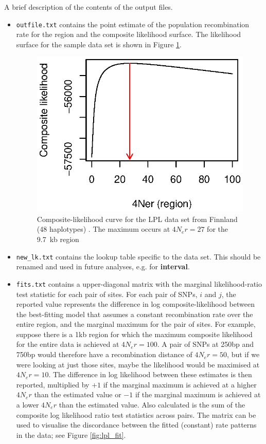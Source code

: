 \documentclass[a4paper,10pt,fullpage]{article}
\begin{document}
\noindent A brief description of the contents of the output files.
\begin{itemize}
\item {\verb+outfile.txt+} contains the point estimate of the
population recombination rate for the region and the composite
likelihood surface.  The likelihood surface for the sample data
set is shown in Figure \ref{fig:lpl_surf}.


\begin{figure}[t]
\linespread{1.3} \centering
\includegraphics[scale=1.0]{LPLCLcurve.eps}
\caption{Composite-likelihood curve for the LPL data set from
Finnland (48 haplotypes) \cite{Nickersonetal98}.  The maximum
occurs at $4N_er=27$ for the 9.7~kb region} \label{fig:lpl_surf}
\end{figure}

\item {\verb+new_lk.txt+} contains the lookup table specific to the
data set.  This should be renamed and used in future analyses,
e.g. for {\bf interval}.

\item {\verb+fits.txt+} contains a upper-diagonal matrix with the
marginal likelihood-ratio test statistic for each pair of sites.
For each pair of SNPs, $i$ and $j$, the reported value represents
the difference in log composite-likelihood between the
best-fitting model that assumes a constant recombination rate over
the entire region, and the marginal maximum for the pair of sites.
For example, suppose there is a 1kb region for which the maximum
composite likelihood for the entire data is achieved at $4N_er =
100$.  A pair of SNPs at 250bp and 750bp would therefore have a
recombination distance of $4N_er = 50$, but if we were looking at
just those sites, maybe the likelihood would be maximised at
$4N_er = 10$.  The difference in log likelihood between these
estimates is then reported, multiplied by $+1$ if the marginal
maximum is achieved at a higher $4N_er$ than the estimated value
or $-1$ if the marginal maximum is achieved at a lower $4N_er$
than the estimated value.  Also calculated is the sum of the
composite log likelihood ratio test statistics across pairs.  The
matrix can be used to visualise the discordance between the fitted
(constant) rate patterns in the data; see Figure
\ref{fig:lpl_fit}.


\end{itemize}
\end{document}

